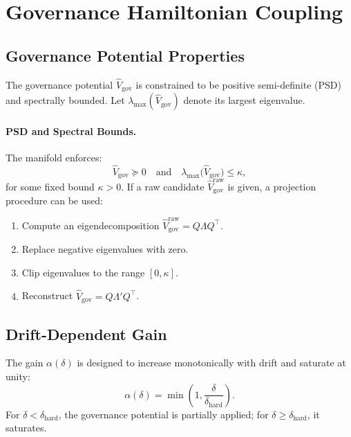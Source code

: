 \documentclass[11pt]{article}
\begin{document}
\section{Governance Hamiltonian Coupling}

\subsection{Governance Potential Properties}

The governance potential $\hat{V}_{\mathrm{gov}}$ is constrained to be positive semi-definite (PSD) and spectrally bounded.
Let $\lambda_{\max}(\hat{V}_{\mathrm{gov}})$ denote its largest eigenvalue.

\paragraph{PSD and Spectral Bounds.}
The manifold enforces:
\begin{equation}
  \hat{V}_{\mathrm{gov}} \succeq 0
  \quad\text{and}\quad
  \lambda_{\max}\big(\hat{V}_{\mathrm{gov}}\big) \le \kappa,
\end{equation}
for some fixed bound $\kappa > 0$.
If a raw candidate $\hat{V}^{\mathrm{raw}}_{\mathrm{gov}}$ is given, a projection procedure can be used:
\begin{enumerate}[noitemsep]
  \item Compute an eigendecomposition $\hat{V}^{\mathrm{raw}}_{\mathrm{gov}} = Q \Lambda Q^\top$.
  \item Replace negative eigenvalues with zero.
  \item Clip eigenvalues to the range $[0,\kappa]$.
  \item Reconstruct $\hat{V}_{\mathrm{gov}} = Q \Lambda' Q^\top$.
\end{enumerate}

\subsection{Drift-Dependent Gain}

The gain $\alpha(\delta)$ is designed to increase monotonically with drift and saturate at unity:
\begin{equation}
  \alpha(\delta) = \min\left(1, \frac{\delta}{\delta_{\mathrm{hard}}}\right).
\end{equation}
For $\delta < \delta_{\mathrm{hard}}$, the governance potential is partially applied; for $\delta \ge \delta_{\mathrm{hard}}$, it saturates.
\end{document}
